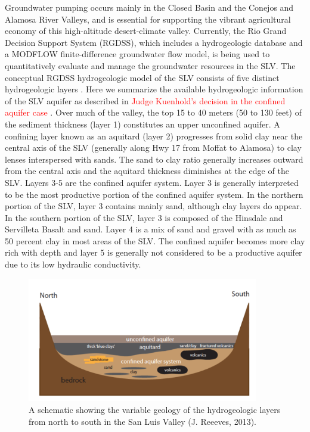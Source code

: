 \documentclass[11pt,final]{article}%
\renewcommand{\citep}{\cite}
\begin{document}
Groundwater pumping occurs mainly in the Closed Basin and the Conejos and Alamosa River Valleys, and is essential for supporting the vibrant agricultural economy of this high-altitude desert-climate valley. Currently, the Rio Grand Decision Support System (RGDSS), which includes a hydrogeologic database and a MODFLOW finite-difference groundwater flow model, is being used to quantitatively evaluate and manage the groundwater resources in the SLV. The conceptual RGDSS hydrogeologic model of the SLV consists of five distinct hydrogeologic layers \citep{RGDSS}. Here we summarize the available hydrogeologic information of the SLV aquifer as described in \textcolor{red}{Judge Kuenhold's decision in the confined aquifer case \citep{Rules}}. Over much of the valley, the top 15 to 40 meters (50 to 130 feet) of the sediment thickness (layer 1) constitutes an upper unconfined aquifer. A confining layer known as an aquitard (layer 2) progresses from solid clay near the central axis of the SLV (generally along Hwy 17 from Moffat to Alamosa) to clay lenses interspersed with sands. The sand to clay ratio generally increases outward from the central axis and the aquitard thickness diminishes at the edge of the SLV. Layers 3-5 are the confined aquifer system. Layer 3 is generally interpreted to be the most productive portion of the confined aquifer system. In the northern portion of the SLV, layer 3 contains mainly sand, although clay layers do appear. In the southern portion of the SLV, layer 3 is composed of the Hinsdale and Servilleta Basalt and sand. Layer 4 is a mix of sand and gravel with as much as 50 percent clay in most areas of the SLV. The confined aquifer becomes more clay rich with depth and layer 5 is generally not considered to be a productive aquifer due to its low hydraulic conductivity.

\begin{figure}
\noindent\includegraphics[width=0.9\textwidth]{Figures/SLVaquifers.png}
\caption{A schematic showing the variable geology of the hydrogeologic layers from north to south in the San Luis Valley (J. Reeeves, 2013).}
\label{fig:slv-aquifers}
\end{figure}
\end{document}
